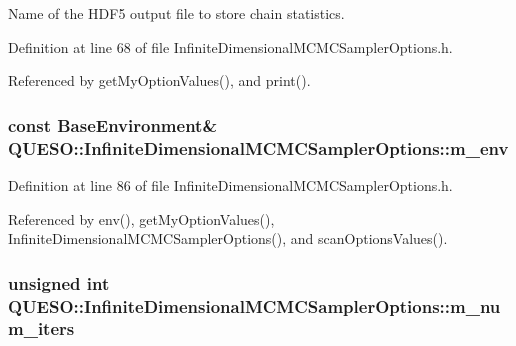 Name of the H\-D\-F5 output file to store chain statistics. 



Definition at line 68 of file Infinite\-Dimensional\-M\-C\-M\-C\-Sampler\-Options.\-h.



Referenced by get\-My\-Option\-Values(), and print().

\hypertarget{class_q_u_e_s_o_1_1_infinite_dimensional_m_c_m_c_sampler_options_a798627198e7d75723bd48d123835503c}{
\subsubsection[{m\-\_\-env}]{\setlength{\rightskip}{0pt plus 5cm}const {\bf Base\-Environment}\& Q\-U\-E\-S\-O\-::\-Infinite\-Dimensional\-M\-C\-M\-C\-Sampler\-Options\-::m\-\_\-env\hspace{0.3cm}{\ttfamily [private]}}}\label{class_q_u_e_s_o_1_1_infinite_dimensional_m_c_m_c_sampler_options_a798627198e7d75723bd48d123835503c}


Definition at line 86 of file Infinite\-Dimensional\-M\-C\-M\-C\-Sampler\-Options.\-h.



Referenced by env(), get\-My\-Option\-Values(), Infinite\-Dimensional\-M\-C\-M\-C\-Sampler\-Options(), and scan\-Options\-Values().

\hypertarget{class_q_u_e_s_o_1_1_infinite_dimensional_m_c_m_c_sampler_options_a65fbd7c98f6e3820206382da50a0133e}{
\subsubsection[{m\-\_\-num\-\_\-iters}]{\setlength{\rightskip}{0pt plus 5cm}unsigned int Q\-U\-E\-S\-O\-::\-Infinite\-Dimensional\-M\-C\-M\-C\-Sampler\-Options\-::m\-\_\-num\-\_\-iters}}\label{class_q_u_e_s_o_1_1_infinite_dimensional_m_c_m_c_sampler_options_a65fbd7c98f6e3820206382da50a0133e}


